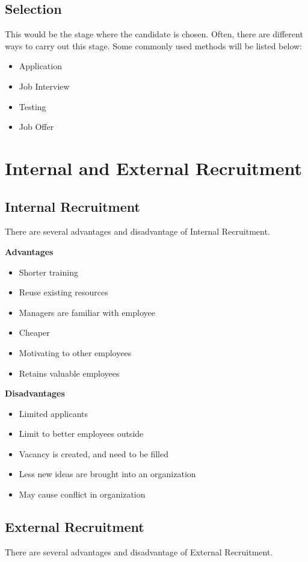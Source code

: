 \documentclass{standalone}
\begin{document}
\subsection{Selection}
This would be the stage where the candidate is chosen.
Often, there are different ways to carry out this stage.
Some commonly used methods will be listed below:
\begin{itemize}
	\item Application
	\item Job Interview
	\item Testing
	\item Job Offer
\end{itemize}

\section{Internal and External Recruitment}

\subsection{Internal Recruitment}
There are several advantages and disadvantage of Internal Recruitment.

\textbf{Advantages}\\
\begin{itemize}
	\item Shorter training
	\item Reuse existing resources
	\item Managers are familiar with employee
	\item Cheaper
	\item Motivating to other employees
	\item Retains valuable employees
\end{itemize}

\textbf{Disadvantages}\\
\begin{itemize}
	\item Limited applicants
	\item Limit to better employees outside
	\item Vacancy is created, and need to be filled
	\item Less new ideas are brought into an organization
	\item May cause conflict in organization
\end{itemize}

\subsection{External Recruitment}
There are several advantages and disadvantage of External Recruitment.
\end{document}

